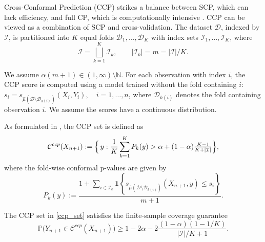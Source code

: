 \documentclass{article}
\theoremstyle{plain}
\theoremstyle{definition}
\theoremstyle{remark}
\begin{document}

Cross-Conformal Prediction (CCP) \citep{vovk2015cross, vovk2018cross} strikes a balance between SCP, which can lack efficiency, and full CP, which is computationally intensive \citep{vovk2005algorithmic}. CCP can be viewed as a combination of SCP and cross-validation. The dataset \(\mathcal D\), indexed by \(\mathcal I\), is partitioned into
\(K\) equal folds \(\mathcal D_1,\ldots,\mathcal D_K\) with index sets
\(\mathcal I_1,\ldots,\mathcal I_K\), where
\[
\mathcal I=\bigsqcup_{k=1}^K \mathcal I_k,
\qquad |\mathcal I_k|=m=|\mathcal I|/K .
\] 

We assume $\alpha(m+1)\in(1,\infty)\setminus\mathbb N$. For each observation with index $i$, the CCP score is computed using a model trained without the fold containing $i$: $s_i = s_{\hat\mu(\mathcal{D}\setminus \mathcal{D}_{k(i)})}(X_i, Y_i), 
\quad i=1,\dots,n$, where $\mathcal{D}_{k(i)}$ denotes the fold containing observation $i$. We assume the scores have a continuous distribution.

As formulated in \citet{gasparinimproving}, the CCP set is defined as
\begin{equation}
\label{ccp_set}
\mathcal{C}^{ccp}(X_{n+1}) 
:= \Bigl\{\, y : \frac{1}{K} \sum_{k=1}^{K} P_k(y) 
> \alpha + (1-\alpha)\tfrac{K-1}{K+|\mathcal{I}|} \Bigr\},
\end{equation}
where the fold-wise conformal p-values are given by
\begin{equation}
\label{cross_pval}
P_k(y) := \frac{1+\sum_{i\in\mathcal{I}_k} 
\mathbf{1}\!\left\{ s_{\hat\mu(\mathcal{D}\setminus \mathcal{D}_{k(i)})}(X_{n+1},y)\le s_i \right\}}{m+1}.
\end{equation}

The CCP set in \eqref{ccp_set} satisfies the finite-sample coverage guarantee
\begin{equation}
\mathbb{P}\!\big(Y_{n+1} \in \mathcal{C}^{ccp}(X_{n+1})\big) 
\ge 1 - 2\alpha - 2\frac{(1-\alpha)(1-1/K)}{|\mathcal{I}|/K + 1}. \label{eq:ccpbound}
\end{equation}
\end{document}
